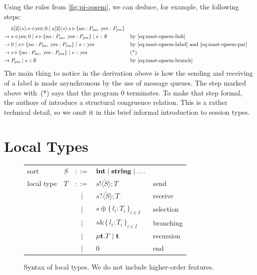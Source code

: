 \documentclass[a4paper,12pt,oneside,fleqn]{book} %
\begin{document}
Using the rules from \autoref{fig:pi-opsem},
  we can deduce, for example, the following steps:
\begin{align*}
  & \bar{a}[2](s). s\triangleleft {\rm yes}; 0
    \mid a[2](s). s\triangleright\{{\rm no} : P_{\rm no},\;
      {\rm yes} : P_{\rm yes} \}
\\
  \to\;
  & s\triangleleft {\rm yes}; 0
    \mid s\triangleright\{{\rm no} : P_{\rm no},\;{\rm yes} : P_{\rm yes}\}
    \mid s :: \emptyset
    &&\text{by \eqref{eq:mast-opsem-link}}
\\
  \to\;
  & 0
    \mid s\triangleright\{{\rm no} : P_{\rm no},\;{\rm yes} : P_{\rm yes}\}
    \mid s :: {\rm yes}
    &&\text{by \eqref{eq:mast-opsem-label} and \eqref{eq:mast-opsem-par}}
\\
  \to\;
  & s\triangleright\{{\rm no} : P_{\rm no},\;{\rm yes} : P_{\rm yes}\}
    \mid s :: {\rm yes}
    &&\text{(*)}
\\
  \to\;
  & P_{\rm yes} \mid s :: \emptyset
  &&\text{by \eqref{eq:mast-opsem-branch}}
\end{align*}
The main thing to notice in the derivation above
  is how the sending and receiving of a label is made
    asynchronous by the use of message queues.
The step marked above with~(*) says that the program 0 terminates.
To make that step formal,
  the authors of \cite{DBLP:journals/jacm/HondaYC16} introduce a
    structural congruence relation.
This is a rather technical detail,
  so we omit it in this brief informal introduction to session types.

\section{Local Types}
\label{sec:mast-local}

\begin{figure}
\begin{center}
\begin{tabular}{lccll}
sort & $S$ & $::=$ & ${\bf int} \mid {\bf string} \mid \ldots$ \\
local type & $T$
  & $::=$ & $s! \langle\tilde{S}\rangle; T$ & send \\
 && $\mid$ & $s? \langle\tilde{S}\rangle; T$ & receive \\
 && $\mid$ & $s \oplus \{\,l_i:T_i\,\}_{i\in I}$ & selection \\
 && $\mid$ & $s \& \{\,l_i:T_i\,\}_{i\in I}$ & branching \\
 && $\mid$ & $\mu{\bf t}.T \mid {\bf t}$ & recursion \\
 && $\mid$ & $0$ & end
\end{tabular}
\end{center}
\caption{
  Syntax of local types.
  We do not include higher-order features.
}\label{fig:pi-types-local}
\end{figure}
\end{document}
